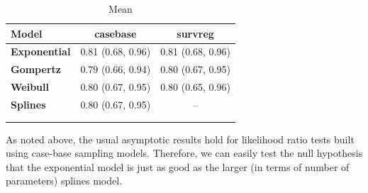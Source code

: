 \documentclass[
]{jss}
\begin{document}
\begin{CodeChunk}
\begin{table}

\caption{\label{tab:unnamed-chunk-4}Mean }
\centering
\begin{tabular}[t]{>{\bfseries}lcc}
\toprule
Model & casebase & survreg\\
\midrule
Exponential & 0.81 (0.68, 0.96) & 0.81 (0.68, 0.96)\\
\cmidrule{1-3}
Gompertz & 0.79 (0.66, 0.94) & 0.80 (0.67, 0.95)\\
\cmidrule{1-3}
Weibull & 0.80 (0.67, 0.95) & 0.80 (0.65, 0.96)\\
\cmidrule{1-3}
Splines & 0.80 (0.67, 0.95) & --\\
\bottomrule
\multicolumn{3}{l}{\textit{Note:}}\\
\multicolumn{3}{l}{Median (Inter-quartile range) is given for Model Size.}\\
\end{tabular}
\end{table}

\end{CodeChunk}

As noted above, the usual asymptotic results hold for likelihood ratio
tests built using case-base sampling models. Therefore, we can easily
test the null hypothesis that the exponential model is just as good as
the larger (in terms of number of parameters) splines model.


\end{document}
